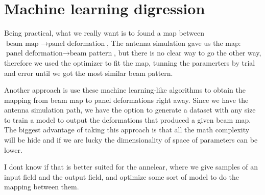\section{Machine learning digression}

Being practical, what we really want is to found a map between $\text{beam map } \rightarrow \text{panel deformation}$, 
The antenna simulation gave us the map: $\text{panel deformation} \rightarrow \text{beam pattern}$, but there is no clear way to go the other way, therefore we used the optimizer to fit the map, tunning the paramerters by trial and error until we got the most similar beam pattern.


Another approach is use these machine learning-like algorithms to obtain the mapping from beam map to panel deformations right away. Since we have the antenna simulation path, we have the option to generate a dataset with any size to train a model to output the deformations that produced a given beam map. The biggest advantage of taking this approach is that all the math complexity will be hide and if we are lucky the dimensionality of space of parameters can be lower.


I dont know if that is better suited for the annelear, where we give samples of an input field and the output field, and optimize some sort of model to do the mapping between them. 


